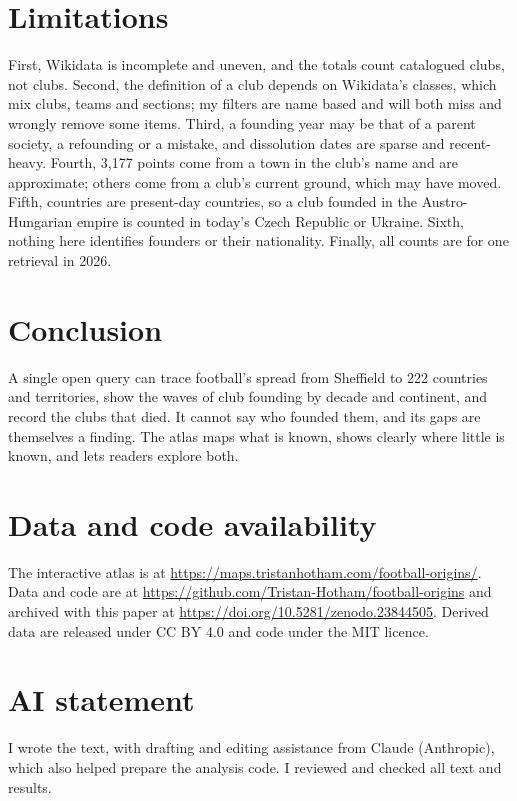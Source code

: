 \documentclass[11pt,a4paper]{article}
\begin{document}
\section{Limitations}
First, Wikidata is incomplete and uneven, and the totals count catalogued clubs, not clubs. Second, the definition of a club depends on Wikidata's classes, which mix clubs, teams and sections; my filters are name based and will both miss and wrongly remove some items. Third, a founding year may be that of a parent society, a refounding or a mistake, and dissolution dates are sparse and recent-heavy. Fourth, 3,177 points come from a town in the club's name and are approximate; others come from a club's current ground, which may have moved. Fifth, countries are present-day countries, so a club founded in the Austro-Hungarian empire is counted in today's Czech Republic or Ukraine. Sixth, nothing here identifies founders or their nationality. Finally, all counts are for one retrieval in 2026.

\section{Conclusion}
A single open query can trace football's spread from Sheffield to 222 countries and territories, show the waves of club founding by decade and continent, and record the clubs that died. It cannot say who founded them, and its gaps are themselves a finding. The atlas maps what is known, shows clearly where little is known, and lets readers explore both.

\section*{Data and code availability}
The interactive atlas is at \url{https://maps.tristanhotham.com/football-origins/}. Data and code are at \url{https://github.com/Tristan-Hotham/football-origins} and archived with this paper at \url{https://doi.org/10.5281/zenodo.23844505}. Derived data are released under CC BY 4.0 and code under the MIT licence.

\section*{AI statement}
I wrote the text, with drafting and editing assistance from Claude (Anthropic), which also helped prepare the analysis code. I reviewed and checked all text and results.
\end{document}
